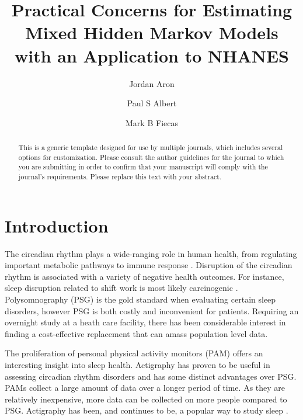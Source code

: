 \documentclass[num-refs]{wiley-article}
\title{Practical Concerns for Estimating Mixed Hidden Markov Models with an Application to NHANES}
\author[1,2\authfn{1}]{Jordan Aron}
\author[1]{Paul S Albert}
\author[2]{Mark B Fiecas}
\affil[1]{Division of Cancer Epidemiology and Genetics, National Cancer Institute, Bethesda, Maryland, USA}
\affil[2]{Department of Biostatistics, University of Minneosta, Minneapolis, Minnesota, USA}
\begin{document}
\begin{frontmatter}
    \maketitle
    
    \begin{abstract}
    This is a generic template designed for use by multiple journals, which includes several options for customization. Please consult the author guidelines for the journal to which you are submitting in order to confirm that your manuscript will comply with the journal's requirements. Please replace this text with your abstract.
    
    \end{abstract}
\end{frontmatter}

\section{Introduction}

The circadian rhythm plays a wide-ranging role in human health, from regulating important metabolic pathways \cite{potterCircadianRhythmSleep2016} to immune response \cite{sharmaCircadianRhythmDisruption2016}. Disruption of the circadian rhythm is associated with a variety of negative health outcomes. For instance, sleep disruption related to shift work is most likely carcinogenic \cite{iarc2010}. Polysomnography (PSG) is the gold standard when evaluating certain sleep disorders, however PSG is both costly and inconvenient for patients\cite{chervin1999}. Requiring an overnight study at a heath care facility, there has been considerable interest in finding a cost-effective replacement that can amass population level data. 

The proliferation of personal physical activity monitors (PAM) offers an interesting insight into sleep health. Actigraphy has proven to be useful in assessing circadian rhythm disorders \cite{morgenthaler2007} and has some distinct advantages over PSG. PAMs collect a large amount of data over a longer period of time. As they are relatively inexpensive, more data can be collected on more people compared to PSG. Actigraphy has been, and continues to be, a popular way to study sleep \cite{ancoli-israelRoleActigraphyStudy2003,sadehRoleActigraphySleep2002,liguoriEvolvingRoleQuantitative2023}.
\end{document}
